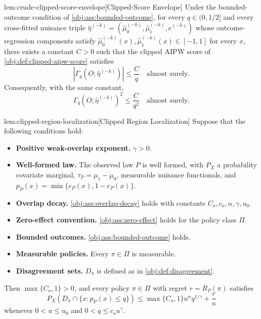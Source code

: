 \begin{lemmav}{lem:crude-clipped-score-envelope}[Clipped-Score Envelope]
Under the bounded-outcome condition of \cref{obj:ass:bounded-outcome}, for every \(q\in(0,1/2]\) and every cross-fitted nuisance triple \(\widehat\eta^{(-k)}=(\widehat\mu_0^{(-k)},\widehat\mu_1^{(-k)},\widehat e^{(-k)})\) whose outcome-regression components satisfy \(\widehat\mu_0^{(-k)}(x),\widehat\mu_1^{(-k)}(x)\in[-1,1]\) for every \(x\), there exists a constant \(C>0\) such that the clipped AIPW score of \cref{obj:def:clipped-aipw-score} satisfies
\[
\left|\Gamma_q\!\left(O;\widehat\eta^{(-k)}\right)\right|\le \frac{C}{q}
\quad\text{almost surely}.
\]
Consequently, with the same constant,
\[
\Gamma_q\!\left(O;\widehat\eta^{(-k)}\right)^2
\le \frac{C}{q^2}
\quad\text{almost surely}.
\]
\end{lemmav}

\begin{lemmav}{lem:clipped-region-localization}[Clipped Region Localization]
Suppose that the following conditions hold:
\begin{itemize}
\item \textbf{Positive weak-overlap exponent.} \(\gamma>0\).
\item \textbf{Well-formed law.} The observed law \(P\) is well formed, with \(P_X\) a probability covariate marginal, \(\tau_P=\mu_1-\mu_0\), measurable nuisance functionals, and \(p_P(x)=\min\{e_P(x),1-e_P(x)\}\).
\item \textbf{Overlap decay.} \cref{obj:ass:overlap-decay} holds with constants \(C_o,c_o,\alpha,\gamma,u_0\).
\item \textbf{Zero-effect convention.} \cref{obj:ass:zero-effect} holds for the policy class \(\Pi\).
\item \textbf{Bounded outcomes.} \cref{obj:ass:bounded-outcome} holds.
\item \textbf{Measurable policies.} Every \(\pi\in\Pi\) is measurable.
\item \textbf{Disagreement sets.} \(D_\pi\) is defined as in \cref{obj:def:disagreement}.
\end{itemize}
Then \(\max\{C_o,1\}>0\), and every policy \(\pi\in\Pi\) with regret \(r=R_P(\pi)\) satisfies
\[
P_X\!\left(D_\pi\cap\{x:p_P(x)\le q\}\right)
\le
\max\{C_o,1\} u^\alpha q^{1/\gamma}+\frac{r}{u}
\]
whenever \(0<u\le u_0\) and \(0<q\le c_o u^\gamma\).
\end{lemmav}

